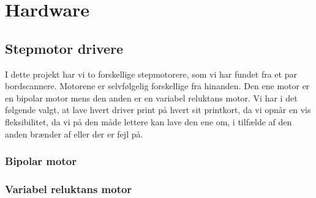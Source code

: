 \chapter{Hardware}


\section{Stepmotor drivere}
I dette projekt har vi to forskellige stepmotorere, som vi har fundet
fra et par bordscannere. Motorene er selvfølgelig forskellige fra
hinanden. Den ene motor er en bipolar motor mens den anden er en
variabel reluktans motor. Vi har i det følgende valgt, at lave hvert
driver print på hvert sit printkort, da vi opnår en vis fleksibilitet,
da vi på den måde lettere kan lave den ene om, i tilfælde af den anden
brænder af eller der er fejl på. 

\subsection{Bipolar motor}


\subsection{Variabel reluktans motor}


